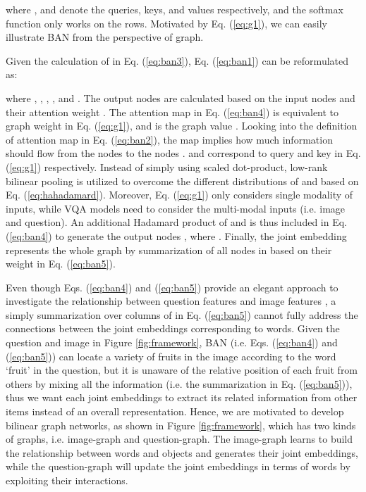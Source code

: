 \documentclass[10pt,twocolumn,letterpaper]{article}
\begin{document}
where , and  denote the queries, keys, and values respectively, and the softmax function only works on the rows. Motivated by Eq. (\ref{eq:g1}), we can easily illustrate BAN from the perspective of graph.

Given the calculation of  in Eq. (\ref{eq:ban3}), Eq. (\ref{eq:ban1}) can be reformulated as:
\vspace{-5pt}

where , , , , and . The output nodes  are calculated based on the input nodes  and their attention weight . The attention map  in Eq. (\ref{eq:ban4}) is equivalent to graph weight  in Eq. (\ref{eq:g1}), and  is the graph value . Looking into the definition of attention map in Eq. (\ref{eq:ban2}), the map  implies how much information should flow from the nodes  to the nodes .  and  correspond to query  and key  in Eq. (\ref{eq:g1}) respectively. Instead of simply using scaled dot-product, low-rank bilinear pooling is utilized to overcome the different distributions of  and  based on Eq. (\ref{eq:hahadamard}). Moreover, Eq. (\ref{eq:g1}) only considers single modality of inputs, while VQA models need to consider the multi-modal inputs (i.e. image and question). An additional Hadamard product of  and  is thus included in Eq. (\ref{eq:ban4}) to generate the output nodes , where . Finally, the joint embedding  represents the whole graph by summarization of all nodes in  based on their weight  in Eq. (\ref{eq:ban5}). 

Even though Eqs. (\ref{eq:ban4}) and (\ref{eq:ban5}) provide an elegant approach to investigate the relationship between question features  and image features , a simply summarization over columns of  in Eq. (\ref{eq:ban5}) cannot fully address the connections between the joint embeddings  corresponding to words. Given the question and image in Figure \ref{fig:framework}, BAN (i.e. Eqs. (\ref{eq:ban4}) and (\ref{eq:ban5})) can locate a variety of fruits in the image according to the word `fruit' in the question, but it is unaware of the relative position of each fruit from others by mixing all the information (i.e. the summarization in Eq. (\ref{eq:ban5})), thus we want each joint embeddings  to extract its related information from other items instead of an overall representation. Hence, we are motivated to develop bilinear graph networks, as shown in Figure \ref{fig:framework}, which has two kinds of graphs, i.e. image-graph and question-graph. The image-graph learns to build the relationship between words and objects and generates their joint embeddings, while the question-graph will update the joint embeddings in terms of words by exploiting their interactions. 
\end{document}
